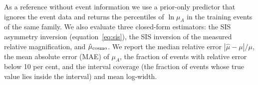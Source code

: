As a reference without event information we use a prior-only predictor that ignores the event data and returns the percentiles of $\ln\mu_A$ in the training events of the same family. We also evaluate three closed-form estimators: the SIS asymmetry inversion (equation~\ref{eq:sis}), the SIS inversion of the measured relative magnification, and $\hat\mu_{\rm cosmo}$. We report the median relative error $|\hat\mu-\mu|/\mu$, the mean absolute error (MAE) of $\mu_A$, the fraction of events with relative error below 10 per cent, and the interval coverage (the fraction of events whose true value lies inside the interval) and mean log-width.
